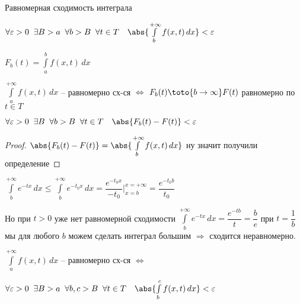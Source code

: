
\begin{definition}
	Равномерная сходимость интеграла
	
	$\forall \varepsilon > 0 \;\; \exists B > a \;\; \forall b > B \;\; \forall t \in T \quad \abs{\int\limits_b^{+\infty} f(x, t)\, dx} < \varepsilon$
	
\end{definition}

\begin{remark}\thmslashn

    $F_b(t) = \int\limits_a^b f(x, t) \, dx$
	
	$\int\limits_a^{+\infty} f(x, t)\, dx$  -- равномерно сх-ся $\Leftrightarrow$ $F_b(t)  \toto{b\to \infty} F(t)$ равномерно по $t \in T$
	
	$\forall \varepsilon > 0\;\; \exists B \;\; \forall b > B \;\; \forall t\in T \quad \abs{F_b(t) - F(t)} < \varepsilon$
	
\end{remark}

\begin{proof}\thmslashn
	
	$\abs{F_b(t) - F(t)} = \abs{\int\limits_b^{+\infty} f(x, t)\, dx}$	ну значит получили определение

\end{proof}

\begin{example}\thmslashn
	
	$\int\limits_b^{+\infty} e^{-tx}\, dx \leqslant \int\limits_b^{+\infty} e^{-t_0x}\, dx  = \dfrac{e^{-t_0x}}{-t_0}\Big|_{x = b}^{x = +\infty} = \dfrac{e^{-t_0b}}{t_0}$

	Но при $t > 0$	уже нет равномерной сходимости $\int\limits_b^{+\infty} e^{-tx}\, dx = \dfrac{e^{-tb}}{t} = \dfrac{b}{e}$ при $t = \dfrac{1}{b}$ мы для любого $b$ можем сделать интеграл большим $\Rightarrow$ сходится неравномерно.
\end{example}

\begin{theorem}\thmslashn
	
	$\int\limits_a^{+\infty} f(x, t)\, dx$  -- равномерно сх-ся $\Leftrightarrow$ 
	
	$\forall \varepsilon > 0\;\; \exists B > a\;\; \forall b, c > B\;\; \forall t \in T \quad \abs{\int\limits_{b}^{c}f(x, t)\,dx} < \varepsilon$
	
\end{theorem}

